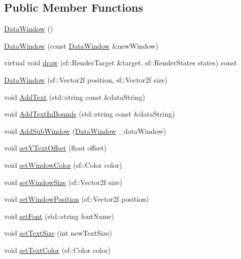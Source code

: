 \subsection*{Public Member Functions}
\begin{DoxyCompactItemize}
\item 
\mbox{\hyperlink{class_data_window_a4a42f108e200e907b98a36e28821d97d}{Data\+Window}} ()
\item 
\mbox{\hyperlink{class_data_window_ae8d140b0dc0599d733e3d5a1f704579c}{Data\+Window}} (const \mbox{\hyperlink{class_data_window}{Data\+Window}} \&new\+Window)
\item 
virtual void \mbox{\hyperlink{class_data_window_a90b82a1d6d1831317002e3badc18c474}{draw}} (sf\+::\+Render\+Target \&target, sf\+::\+Render\+States states) const
\item 
\mbox{\hyperlink{class_data_window_a8e8d9430e25c484396f7a66f080c029b}{Data\+Window}} (sf\+::\+Vector2f position, sf\+::\+Vector2f size)
\item 
void \mbox{\hyperlink{class_data_window_a8bec28c4e6514e9b62b10686e0e9b40d}{Add\+Text}} (std\+::string const \&data\+String)
\item 
void \mbox{\hyperlink{class_data_window_ab86de68d9766781ee295c69dbee5a985}{Add\+Text\+In\+Bounds}} (std\+::string const \&data\+String)
\item 
void \mbox{\hyperlink{class_data_window_a0e57ffff01c3dad8282f9768a3c9e949}{Add\+Sub\+Window}} (\mbox{\hyperlink{class_data_window}{Data\+Window}} \+\_\+data\+Window)
\item 
void \mbox{\hyperlink{class_data_window_a48139ad5b1c02366b1f29498839da434}{set\+Y\+Text\+Offset}} (float offset)
\item 
void \mbox{\hyperlink{class_data_window_ab06d2ddf751a472f8f2305084f572a4b}{set\+Window\+Color}} (sf\+::\+Color color)
\item 
void \mbox{\hyperlink{class_data_window_af883ff10816a9ad49b7b794c3e9f8f92}{set\+Window\+Size}} (sf\+::\+Vector2f size)
\item 
void \mbox{\hyperlink{class_data_window_ab28e270817e9cdc56c78d9723c485d8f}{set\+Window\+Position}} (sf\+::\+Vector2f position)
\item 
void \mbox{\hyperlink{class_data_window_a66d08b9e2df3b4960fe4e030aabf61be}{set\+Font}} (std\+::string font\+Name)
\item 
void \mbox{\hyperlink{class_data_window_aa9fe53356b3989e0781a13a03814aaac}{set\+Text\+Size}} (int new\+Text\+Size)
\item 
void \mbox{\hyperlink{class_data_window_a05ac7ad6357b9cabd0436c181c6cf29d}{set\+Text\+Color}} (sf\+::\+Color color)

\end{DoxyCompactItemize}
